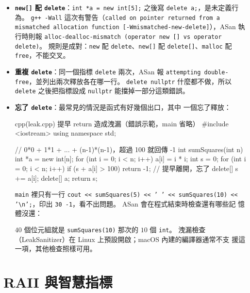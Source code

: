 \begin{itemize}
\item \textbf{\texttt{new[]} 配 \texttt{delete}}：\texttt{int *a = new
int[5];} 之後寫 \texttt{delete a;}，是未定義行為。 \texttt{g++ -Wall}
這次有警告（\texttt{called on pointer returned from a mismatched
allocation function [-Wmismatched-new-delete]}），ASan 執行時則報
\texttt{alloc-dealloc-mismatch (operator new [] vs operator delete)}。
規則是成對：\texttt{new} 配 \texttt{delete}、\texttt{new[]} 配
\texttt{delete[]}、\texttt{malloc} 配 \texttt{free}，不能交叉。
\item \textbf{重複 \texttt{delete}}：同一個指標 \texttt{delete} 兩次，ASan
報 \texttt{attempting double-free}，並列出兩次釋放各在哪一行。
\texttt{delete nullptr} 什麼都不做，所以
\texttt{delete} 之後把指標設成 \texttt{nullptr} 能擋掉一部分這類錯誤。
\item \textbf{忘了 \texttt{delete}}：最常見的情況是函式有好幾個出口，其中
一個忘了釋放：
\begin{code}{cpp}{(leak.cpp) 提早 return 造成洩漏（錯誤示範，main 省略）}
#include <iostream>
using namespace std;

// 0*0 + 1*1 + ... + (n-1)*(n-1)，超過 100 就回傳 -1
int sumSquares(int n) {
    int *a = new int[n];
    for (int i = 0; i < n; i++) {
        a[i] = i * i;
    }
    int s = 0;
    for (int i = 0; i < n; i++) {
        if (s + a[i] > 100) {
            return -1;           // 提早離開，忘了 delete[]
        }
        s += a[i];
    }
    delete[] a;
    return s;
}
\end{code}
\texttt{main} 裡只有一行 \texttt{cout << sumSquares(5) << ' ' <<
sumSquares(10) << '\textbackslash n';}，印出 \texttt{30 -1}，看不出問題。 ASan 會在程式結束時檢查還有哪些記
憶體沒還：
$40$ 個位元組就是 \texttt{sumSquares(10)} 那次的 $10$ 個 \texttt{int}。
洩漏檢查（LeakSanitizer）在 Linux 上預設開啟；macOS 內建的編譯器通常不支
援這一項，其他檢查照樣可用。
\end{itemize}

\section{RAII 與智慧指標}
\label{sec:raii}

